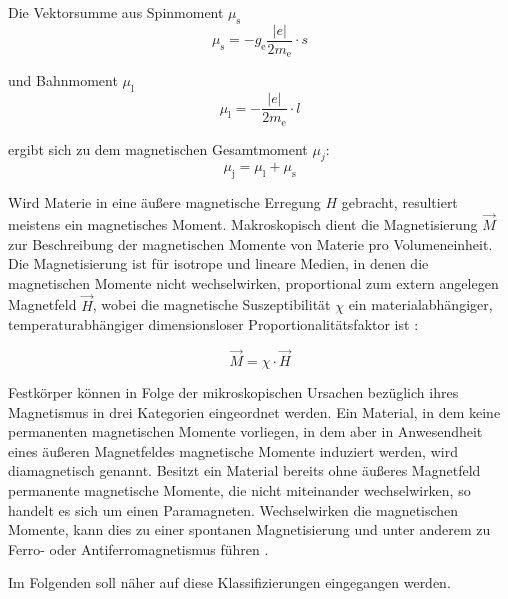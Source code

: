 \documentclass[page,pdftex,12pt,a4paper,twoside,openright]{scrbook}
\begin{document}
Die Vektorsumme aus Spinmoment \(\mu_\mathrm{s}\)
\begin{equation}
\label{eq-spinmoment}
 \mu_\mathrm{s} = - g_\mathrm{e} \frac{\vert e \vert}{2 m_\mathrm{e}} \cdot s
\end{equation}


und Bahnmoment \(\mu_\mathrm{l}\) 
\begin{equation}
\label{eq-bahnmoment}
 \mu_\mathrm{l} = - \frac{\vert e \vert}{2 m_\mathrm{e}} \cdot l
\end{equation}

ergibt sich zu dem magnetischen Gesamtmoment \(\mu_j\):
\begin{equation}
\label{eq-gesamtmoment}
\mu_\mathrm{j} = \mu_\mathrm{l} + \mu_\mathrm{s}
\end{equation}

Wird Materie in eine äußere magnetische Erregung \(H\) gebracht, resultiert meistens ein magnetisches Moment. Makroskopisch dient die Magnetisierung \(\vec{M}\) zur Beschreibung der magnetischen Momente von Materie pro Volumeneinheit. Die Magnetisierung ist für isotrope und lineare Medien, in denen die magnetischen Momente nicht wechselwirken, proportional zum extern angelegen Magnetfeld \(\vec{H}\), wobei die magnetische Suszeptibilität \(\chi\) ein materialabhängiger, temperaturabhängiger dimensionsloser Proportionalitätsfaktor ist \cite{kassing_bergmann_2005,nolting_grundkurs_2013}:

\begin{equation}
\label{eq-magnetisierung}
\vec{M} = \chi \cdot \vec{H}
\end{equation}

Festkörper können in Folge der mikroskopischen Ursachen bezüglich ihres Magnetismus in drei Kategorien eingeordnet werden. Ein Material, in dem keine permanenten magnetischen Momente vorliegen, in dem aber in Anwesendheit eines äußeren Magnetfeldes magnetische Momente induziert werden, wird diamagnetisch genannt. Besitzt ein Material bereits ohne äußeres Magnetfeld permanente magnetische Momente, die nicht miteinander wechselwirken, so handelt es sich um einen Paramagneten. Wechselwirken die magnetischen Momente, kann dies zu einer spontanen Magnetisierung und unter anderem zu Ferro- oder Antiferromagnetismus führen \cite{gross_festkorperphysik_2012}.

Im Folgenden soll näher auf diese Klassifizierungen eingegangen werden.
\end{document}
